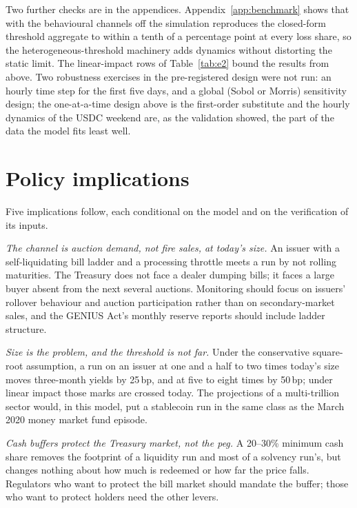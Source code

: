 Two further checks are in the appendices. Appendix~\ref{app:benchmark} shows that with the behavioural channels
off the simulation reproduces the closed-form threshold aggregate to within a tenth of a percentage point at every
loss share, so the heterogeneous-threshold machinery adds dynamics without distorting the static limit. The
linear-impact rows of Table~\ref{tab:e2} bound the results from above. Two robustness exercises in the
pre-registered design were not run: an hourly time step for the first five days, and a global (Sobol or Morris)
sensitivity design; the one-at-a-time design above is the first-order substitute and the hourly dynamics of the
USDC weekend are, as the validation showed, the part of the data the model fits least well.

\section{Policy implications}\label{sec:policy}

Five implications follow, each conditional on the model and on the verification of its inputs.

\emph{The channel is auction demand, not fire sales, at today's size.} An issuer with a self-liquidating bill ladder
and a processing throttle meets a run by not rolling maturities. The Treasury does not face a dealer dumping bills;
it faces a large buyer absent from the next several auctions. Monitoring should focus on issuers' rollover behaviour
and auction participation rather than on secondary-market sales, and the GENIUS Act's monthly reserve reports
should include ladder structure.

\emph{Size is the problem, and the threshold is not far.} Under the conservative square-root assumption, a run on an
issuer at one and a half to two times today's size moves three-month yields by 25\,bp, and at five to eight times by
50\,bp; under linear impact those marks are crossed today. The projections of a multi-trillion sector would, in this
model, put a stablecoin run in the same class as the March 2020 money market fund episode.

\emph{Cash buffers protect the Treasury market, not the peg.} A 20--30\% minimum cash share removes the footprint of
a liquidity run and most of a solvency run's, but changes nothing about how much is redeemed or how far the price
falls. Regulators who want to protect the bill market should mandate the buffer; those who want to protect holders
need the other levers.

